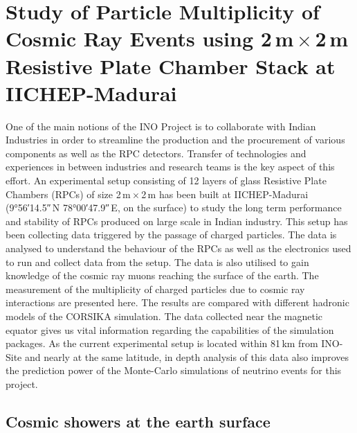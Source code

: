 
\chapter{Study of Particle Multiplicity of Cosmic Ray Events using
  2\,m\,$\times$\,2\,m Resistive Plate Chamber Stack at IICHEP-Madurai}
\label{chapter:multi}

One of the main notions of the INO Project is to collaborate with
Indian Industries in order to streamline the production and the
procurement of various components as well as the RPC detectors.
Transfer of technologies and experiences in between industries and
research teams is the key aspect of this effort.
An experimental setup consisting of 12 layers of glass Resistive Plate
Chambers (RPCs) of size 2\,m\,$\times$\,2\,m has been built at
IICHEP-Madurai (\ang{9;56;14.5}\,N \ang{78;00;47.9}\,E, on the surface)
to study the long term performance and stability of RPCs produced on
large scale in Indian industry. This setup has been collecting data
triggered by the passage of charged particles. The data is analysed
to understand the behaviour of the RPCs as well as the electronics
used to run and collect data from the setup. The data is also utilised
to gain knowledge of the cosmic ray muons reaching the surface of
the earth. The measurement of the multiplicity of charged particles
due to
cosmic ray interactions are presented here. The results are compared
with different hadronic models of the CORSIKA simulation. The data
collected near the magnetic equator gives us vital information
regarding the capabilities of the simulation packages. As the current
experimental setup is located within 81\,km from INO-Site and
  nearly at the same latitude, in depth
analysis of this data also improves the prediction power of
the Monte-Carlo simulations of neutrino events for this project.

\section{Cosmic showers at the earth surface}

